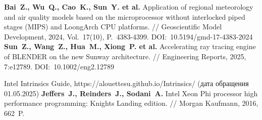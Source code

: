 \begin{thebibliography}{99}
\textbf{Bai~Z., Wu~Q., Cao~K., Sun~Y. et al.} Application of regional meteorology and air quality models based on the microprocessor without interlocked piped stages (MIPS) and LoongArch CPU platforms. // Geoscientific Model Development, 2024, Vol.~17(10), P.~4383-4399. DOI:~10.5194/gmd-17-4383-2024
\textbf{Sun~Z., Wang~Z., Hua~M., Xiong~P. et al.} Accelerating ray tracing engine of BLENDER on the new Sunway architecture. // Engineering Reports, 2025, 7:e12789. DOI:~10.1002/eng2.12789

Intel Intrinsics Guide, https://alouettesu.github.io/Intrinsics/ (дата обращения 01.05.2025)
\textbf{Jeffers~J., Reinders~J., Sodani~A.} Intel Xeon Phi processor high performance programming: Knights Landing edition. // Morgan Kaufmann, 2016, 662~P.


\end{thebibliography}
